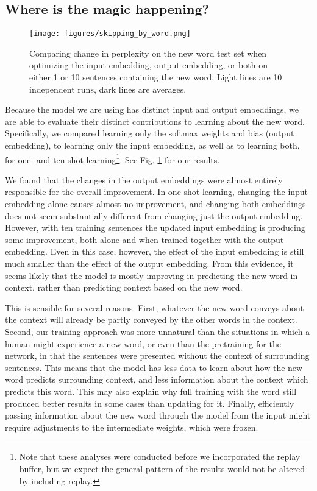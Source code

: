 \documentclass{article}
\begin{document}
\subsection{Where is the magic happening?}
\begin{figure}[t]
\centering
\texttt{[image: figures/skipping\_by\_word.png]}
\caption{Comparing change in perplexity on the new word test set when optimizing the input embedding, output embedding, or both on either 1 or 10 sentences containing the new word. Light lines are 10 independent runs, dark lines are averages.}
\label{skipping_results}
\end{figure}
Because the model we are using has distinct input and output embeddings, we are able to evaluate their distinct contributions to learning about the new word. Specifically, we compared learning only the softmax weights and bias (output embedding), to learning only the input embedding, as well as to learning both, for one- and ten-shot learning\footnote{Note that these analyses were conducted before we incorporated the replay buffer, but we expect the general pattern of the results would not be altered by including replay.}. See Fig. \ref{skipping_results} for our results.\par
We found that the changes in the output embeddings were almost entirely responsible for the overall improvement. In one-shot learning, changing the input embedding alone causes almost no improvement, and changing both embeddings does not seem substantially different from changing just the output embedding. However, with ten training sentences the updated input embedding is producing some improvement, both alone and when trained together with the output embedding. Even in this case, however, the effect of the input embedding is still much smaller than the effect of the output embedding. From this evidence, it seems likely that the model is mostly improving in predicting the new word in context, rather than predicting context based on the new word. \par
This is sensible for several reasons. First, whatever the new word conveys about the context will already be partly conveyed by the other words in the context. Second, our training approach was more unnatural than the situations in which a human might experience a new word, or even than the pretraining for the network, in that the sentences were presented without the context of surrounding sentences. This means that the model has less data to learn about how the new word predicts surrounding context, and less information about the context which predicts this word. This may also explain why full training with the word still produced better results in some cases than updating for it. Finally, efficiently passing information about the new word through the model from the input might require adjustments to the intermediate weights, which were frozen.\par
\end{document}
